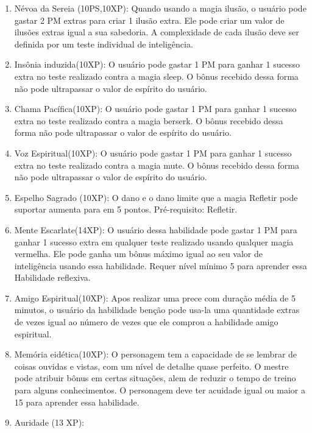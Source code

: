 \begin{enumerate}
		\item Névoa da Sereia (10PS,10XP): Quando usando a magia ilusão, o usuário pode gastar 2 PM extras para criar 1 ilusão extra. Ele pode criar um valor de ilusões extras igual a sua sabedoria. A complexidade de cada ilusão deve ser definida por um teste individual de inteligência.	
		
	\item Insônia induzida(10XP): O usuário pode gastar 1 PM para ganhar 1 sucesso extra no teste realizado contra a magia sleep. O bônus recebido dessa forma não pode ultrapassar o valor de espírito do usuário.
	
	\item Chama Pacífica(10XP): O usuário pode gastar 1 PM para ganhar 1 sucesso extra no teste realizado contra a magia berserk. O bônus recebido dessa forma não pode ultrapassar o valor de espírito do usuário.
		
	\item Voz Espiritual(10XP): O usuário pode gastar 1 PM para ganhar 1 sucesso extra no teste realizado contra a magia mute. O bônus recebido dessa forma não pode ultrapassar o valor de espírito do usuário.
	
	\item Espelho Sagrado (10XP): O dano e o dano limite que a magia Refletir pode suportar aumenta para em 5 pontos. Pré-requisito: Refletir.
	
	\item Mente Escarlate(14XP): O usuário dessa habilidade pode gastar 1 PM para ganhar 1 sucesso extra em qualquer teste realizado usando qualquer magia vermelha. Ele pode ganha um bônus máximo igual ao seu valor de inteligência usando essa habilidade. Requer nível mínimo 5 para aprender essa Habilidade reflexiva.

	\item Amigo Espiritual(10XP): Apos realizar uma prece com duração média de 5 minutos, o usuário da habilidade benção pode usa-la uma quantidade extras de vezes igual ao número de vezes que ele comprou a habilidade amigo espiritual. 

	\item Memória eidética(10XP): O personagem tem a capacidade de se lembrar de coisas ouvidas e vistas, com um nível de detalhe quase perfeito. O mestre pode atribuir bônus em certas situações, alem de reduzir o tempo de treino para alguns conhecimentos. O personagem deve ter acuidade igual ou maior a 15 para aprender essa habilidade.

		\item Auridade (13 XP): %


\end{enumerate}
